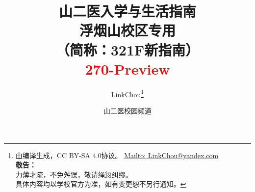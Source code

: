 

\title{%
\normalsize
{\Huge\textbf{山二医入学与生活指南}}\\[6pt]
{\large\textbf{浮烟山校区专用}}\\
（简称：321F新指南）\\[15pt]
{\large\textcolor{red}{270-Preview}}\vspace*{-25pt}}
\author{LinkChou\thanks{由\LaTeXe 编译生成，CC BY-SA 4.0协议。%
\uline{\href{Mailto:LinkChou@yandex.com}{Mailto: LinkChou@yandex.com}}\\%
\textbf{敬告：}\\%
\indent\indent 力薄才疏，不免舛误，敬请绳愆纠缪。\\%
\indent\indent 具体内容均以学校官方为准，如有变更恕不另行通知。}\and 山二医校园频道}
\date{\DTMnow}
\maketitle

\renewcommand{\thefootnote}{\arabic{footnote}}

\tableofcontents